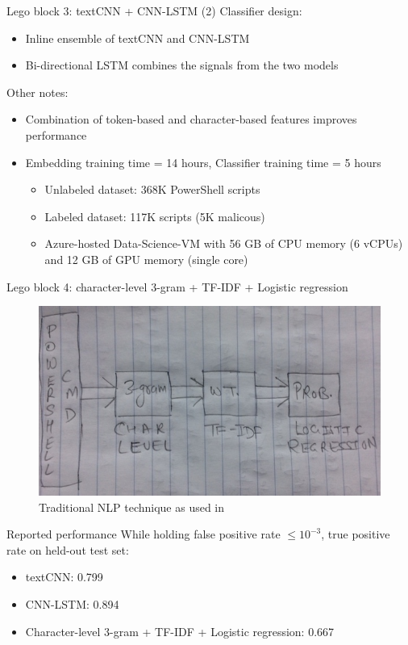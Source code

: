 \documentclass[10pt]{beamer}
\begin{document}
\begin{frame}{Lego block 3: textCNN + CNN-LSTM (2)}
	Classifier design:
	\begin{itemize}
		\item Inline ensemble of textCNN and CNN-LSTM
		\item Bi-directional LSTM combines the signals from the two models
	\end{itemize}
	Other notes:
	\begin{itemize}
		\item Combination of token-based and character-based features improves performance
		\item Embedding training time = 14 hours, Classifier training time = 5 hours
		\begin{itemize}
			\item Unlabeled dataset: 368K PowerShell scripts
			\item Labeled dataset: 117K scripts (5K malicous)
			\item Azure-hosted Data-Science-VM with 56 GB of CPU memory (6 vCPUs) and 12 GB of GPU memory (single core)
		\end{itemize}
	\end{itemize}
\end{frame}

\begin{frame}{Lego block 4: character-level 3-gram + TF-IDF + Logistic regression}
	\begin{figure}
		\includegraphics[scale=0.50]{3gram-tfidf-logistic}
		\caption{Traditional NLP technique as used in \cite{amsi2019}}
	\end{figure}
\end{frame}

\begin{frame}{Reported performance}
        While holding false positive rate $\le 10^{-3}$, true positive rate on held-out test set:
        \begin{itemize}
		\item textCNN: 0.799
		\item CNN-LSTM: 0.894
		\item Character-level 3-gram + TF-IDF + Logistic regression: 0.667
        \end{itemize}
\end{frame}
\end{document}
